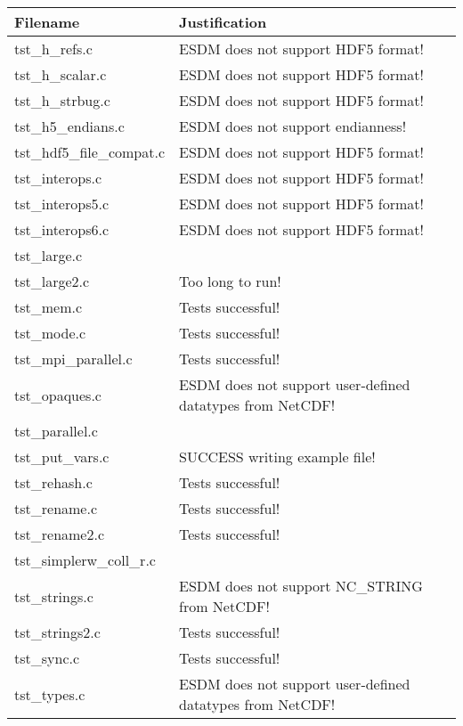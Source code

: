 \begin{table}[H]
\centering
\begin{tabular}{|l|l|}
\hline
Filename & Justification \\ \hline \hline
tst\_h\_refs.c   &   ESDM does not support HDF5 format!    \\ \hline
tst\_h\_scalar.c   &  ESDM does not support HDF5 format!    \\ \hline
tst\_h\_strbug.c   &  ESDM does not support HDF5 format!     \\ \hline
tst\_h5\_endians.c   &   ESDM does not support endianness!  \\ \hline
tst\_hdf5\_file\_compat.c   &  ESDM does not support HDF5 format!     \\ \hline
tst\_interops.c   &   ESDM does not support HDF5 format!    \\ \hline
tst\_interops5.c   &   ESDM does not support HDF5 format!    \\ \hline
tst\_interops6.c   &   ESDM does not support HDF5 format!    \\ \hline
tst\_large.c   &      \\ \hline
tst\_large2.c   &  Too long to run! \\ \hline
tst\_mem.c   &    Tests successful!   \\ \hline
tst\_mode.c   &   Tests successful!    \\ \hline
tst\_mpi\_parallel.c   & Tests successful!   \\ \hline
tst\_opaques.c   &  ESDM does not support user-defined datatypes from NetCDF!     \\ \hline
tst\_parallel.c   &       \\ \hline
tst\_put\_vars.c   &   SUCCESS writing example file!    \\ \hline
tst\_rehash.c   & Tests successful!  \\ \hline
tst\_rename.c   &  Tests successful!  \\ \hline
tst\_rename2.c   & Tests successful!    \\ \hline
tst\_simplerw\_coll\_r.c   &     \\ \hline
tst\_strings.c   &  ESDM does not support NC\_STRING from NetCDF!     \\ \hline
tst\_strings2.c   &   Tests successful!    \\ \hline
tst\_sync.c   &   Tests successful! \\ \hline
tst\_types.c   &  ESDM does not support user-defined datatypes from NetCDF!     \\ \hline

\end{tabular}
\end{table}
